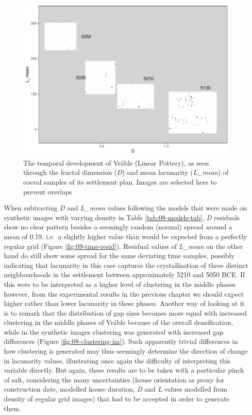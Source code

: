 \documentclass[
  12pt,
  a4paper, twoside]{book}
\begin{document}
\begin{figure}

{\centering \includegraphics[width=0.9\linewidth]{Results/fig09_time} 

}

\caption[Selected temporal samples images of Vráble, plotted by D and L\_mean estimates]{The temporal development of Vráble (Linear Pottery), as seen through the fractal dimension (\emph{D}) and mean lacunarity (\emph{L\_mean}) of coeval samples of its settlement plan. Images are selected here to prevent overlaps}\label{fig:09-time}
\end{figure}

When subtracting \emph{D} and \emph{L\_mean} values following the models that were made on synthetic images with varying density in Table \ref{tab:08-models-tab}, \emph{D} residuals show no clear pattern besides a seemingly random (normal) spread around a mean of 0.19, i.e.~a slightly higher value than would be expected from a perfectly regular grid (Figure \ref{fig:09-time-resid}). Residual values of \emph{L\_mean} on the other hand do still show some spread for the same deviating time samples, possibly indicating that lacunarity in this case captures the crystallisation of three distinct neighbourhoods in the settlement between approximately 5210 and 5050 BCE. If this were to be interpreted as a higher level of clustering in the middle phases however, from the experimental results in the previous chapter we should expect higher rather than lower lacunarity in these phases. Another way of looking at it is to remark that the distribution of gap sizes becomes more equal with increased clustering in the middle phases of Vráble because of the overall densification, while in the synthetic images clustering was generated with increased gap differences (Figure \ref{fig:08-clustering-im}). Such apparently trivial differences in how clustering is generated may thus seemingly determine the direction of change in lacunarity values, illustrating once again the difficulty of interpreting this variable directly. But again, these results are to be taken with a particular pinch of salt, considering the many uncertainties (house orientation as proxy for construction date, modelled house duration, \emph{D} and \emph{L} values modelled from density of regular grid images) that had to be accepted in order to generate them.
\end{document}
